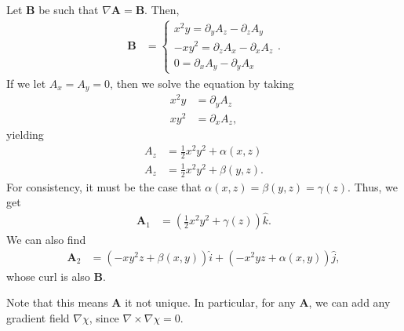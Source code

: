 \documentclass[10pt]{mypackage}
\begin{document}
\begin{example}
  Let $\mathbf{B}$ be such that $\nabla \mathbf{A} = \mathbf{B}$. Then,
  \begin{align*}
    \mathbf{B} &= \begin{cases}
      x^2y = \partial_y A_z - \partial_z A_y\\
      -xy^2 = \partial_z A_x - \partial_x A_z\\
      0 = \partial_x A_y - \partial_y A_x
    \end{cases}.
  \end{align*}
  If we let $A_x = A_y = 0$, then we solve the equation by taking
  \begin{align*}
    x^2 y &= \partial_y A_z\\
    xy^2 &= \partial_xA_z,
  \end{align*}
  yielding
  \begin{align*}
    A_z &= \frac{1}{2}x^2y^2 + \alpha(x,z)\\
    A_z &= \frac{1}{2}x^2y^2 + \beta(y,z).
  \end{align*}
  For consistency, it must be the case that $\alpha(x,z) = \beta(y,z) = \gamma(z)$. Thus, we get
  \begin{align*}
    \mathbf{A}_1 &= \left(\frac{1}{2}x^2y^2 + \gamma(z)\right)\hat{k}.
  \end{align*}
  We can also find
  \begin{align*}
    \mathbf{A}_2 &= \left(-xy^2z + \beta(x,y)\right)\hat{i} + \left(-x^2yz + \alpha(x,y)\right)\hat{j},
  \end{align*}
  whose curl is also $\mathbf{B}$.\newline

  Note that this means $\mathbf{A}$ it not unique. In particular, for any $\mathbf{A}$, we can add any gradient field $\nabla \chi$, since $\nabla \times \nabla \chi = 0$.
\end{example}
\end{document}
